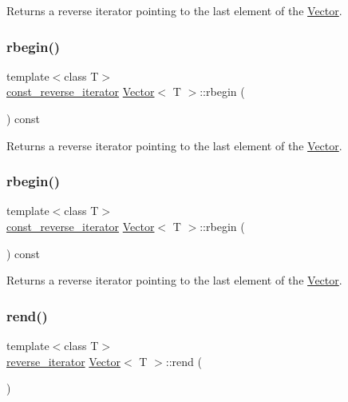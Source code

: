 Returns a reverse iterator pointing to the last element of the \hyperlink{classVector}{Vector}. \mbox{\label{classVector_a0a43fdc1d2f4b49ed085545e6e53a409}} 
\subsubsection{\texorpdfstring{rbegin()}{rbegin()}\hspace{0.1cm}{\footnotesize\ttfamily [3/4]}}
{\footnotesize\ttfamily template$<$class T$>$ \\
\hyperlink{classVector_a963c193ac2399eed1cf20d74f559ef2a}{const\+\_\+reverse\+\_\+iterator} \hyperlink{classVector}{Vector}$<$ T $>$\+::rbegin (\begin{DoxyParamCaption}{ }\end{DoxyParamCaption}) const\hspace{0.3cm}{\ttfamily [inline]}}

Returns a reverse iterator pointing to the last element of the \hyperlink{classVector}{Vector}. \mbox{\label{classVector_a0a43fdc1d2f4b49ed085545e6e53a409}} 
\subsubsection{\texorpdfstring{rbegin()}{rbegin()}\hspace{0.1cm}{\footnotesize\ttfamily [4/4]}}
{\footnotesize\ttfamily template$<$class T$>$ \\
\hyperlink{classVector_a963c193ac2399eed1cf20d74f559ef2a}{const\+\_\+reverse\+\_\+iterator} \hyperlink{classVector}{Vector}$<$ T $>$\+::rbegin (\begin{DoxyParamCaption}{ }\end{DoxyParamCaption}) const\hspace{0.3cm}{\ttfamily [inline]}}

Returns a reverse iterator pointing to the last element of the \hyperlink{classVector}{Vector}. \mbox{\label{classVector_a74380623d29305cf5c9a544756672ef5}} 
\subsubsection{\texorpdfstring{rend()}{rend()}\hspace{0.1cm}{\footnotesize\ttfamily [1/4]}}
{\footnotesize\ttfamily template$<$class T$>$ \\
\hyperlink{classVector_a6afe8339bd8b2187c173c0f46bbd7d63}{reverse\+\_\+iterator} \hyperlink{classVector}{Vector}$<$ T $>$\+::rend (\begin{DoxyParamCaption}{ }\end{DoxyParamCaption})\hspace{0.3cm}{\ttfamily [inline]}}

